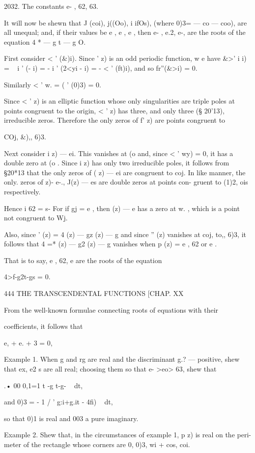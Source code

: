 {2032. The constants e- , 62, 63.

It will now be shewn that J (coi), j((Oo), i ifOs), (where 0)3= — co —
coo), are all unequal; and, if their values be e , e , e , then e- ,
e.2, e-, are the roots of the equation 4 * — g t — g O.

First consider < ' (\&)i). Since ' z) is an odd periodic function, w e
have \&>' i i) = ~ i ' (- i) = - i ' (2<yi - i) = - < ' (ft)i), and so
fr''(\&>i) = 0.

Similarly < ' w. = ( ' (0)3) = 0.

Since < ' z) is an elliptic function whose only singularities are
triple poles at points congruent to the origin, < ' z) has three, and
only three (§ 20'13), irreducible zeros. Therefore the only zeros of
f' z) are points congruent to

COj, \&),, 6)3.

Next consider i z) — ei. This vanishes at (o and, since < ' wy) = 0,
it has a double zero at (o . Since i z) has only two irreducible
poles, it follows from §20*13 that the only zeros of ( z) — ei are
congruent to coj. In like manner, the only. zeros of z)- e-., J(z) —
es are double zeros at points con- gruent to (1)2, ois respectively.

Hence i 62 = s- For if gj = e , then (z) — e has a zero at w. , which
is a point not congruent to Wj.

Also, since ' (z) = 4 (z) — gz (z) — g and since '' (z) vanishes at
coj, to,, 6)3, it follows that 4 =* (z) — g2 (z) — g vanishes when p
(z) = e , 62 or e .

That is to say, e , 62, e are the roots of the equation

4>f-g2t-gs = 0.

444 THE TRANSCENDENTAL FUNCTIONS [CHAP. XX

From the well-known formulae connecting roots of equations with their

coefficients, it follows that

e, + e. + 3 = 0,

Example 1. When g and rg are real and the discriminant g.? — %
positive, shew that ex, e2 s are all real; choosing them so that e-
>eo> 63, shew that

.• 00 0,1=1 t -g t-g- ~ dt,

and 0)3 = - 1 / ' g:i+g.it - 4fi) ~ dt,

so that 0)1 is real and 003 a pure imaginary.

Example 2. Shew that, in the circumstances of example 1, p z) is real
on the peri- meter of the rectangle whose corners are 0, 0)3, wi +
cos, coi.

}
